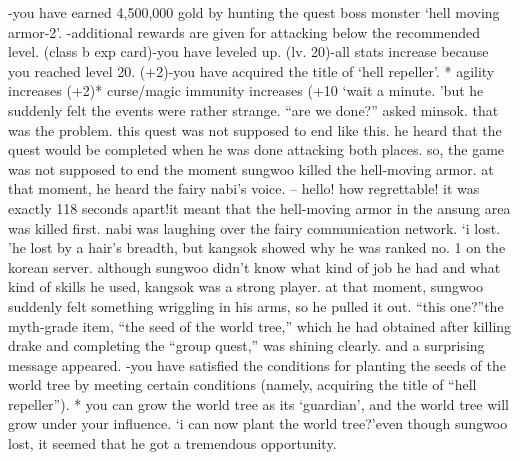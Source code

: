 -you have earned 4,500,000 gold by hunting the quest boss monster ‘hell moving armor-2’.
-additional rewards are given for attacking below the recommended level.
 (class b exp card)-you have leveled up.
 (lv.
 20)-all stats increase because you reached level 20.
 (+2)-you have acquired the title of ‘hell repeller’.
* agility increases (+2)* curse/magic immunity increases (+10%
‘wait a minute.
’but he suddenly felt the events were rather strange.
“are we done?” asked minsok.
that was the problem.
 this quest was not supposed to end like this.
 he heard that the quest would be completed when he was done attacking both places.
so, the game was not supposed to end the moment sungwoo killed the hell-moving armor.
at that moment, he heard the fairy nabi’s voice.
– hello! how regrettable! it was exactly 118 seconds apart!it meant that the hell-moving armor in the ansung area was killed first.
 nabi was laughing over the fairy communication network.
‘i lost.
’he lost by a hair’s breadth, but kangsok showed why he was ranked no.
 1 on the korean server.
 although sungwoo didn’t know what kind of job he had and what kind of skills he used, kangsok was a strong player.
at that moment, sungwoo suddenly felt something wriggling in his arms, so he pulled it out.
“this one?”the myth-grade item, “the seed of the world tree,” which he had obtained after killing drake and completing the “group quest,” was shining clearly.
and a surprising message appeared.
-you have satisfied the conditions for planting the seeds of the world tree by meeting certain conditions (namely, acquiring the title of “hell repeller”).
* you can grow the world tree as its ‘guardian’, and the world tree will grow under your influence.
‘i can now plant the world tree?’even though sungwoo lost, it seemed that he got a tremendous opportunity.


 